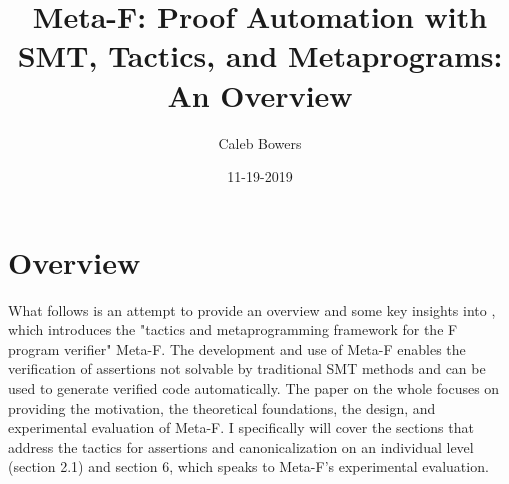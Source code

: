 \documentclass[10pt, journal]{IEEEtran}
\title{Meta-F\text{*}: Proof Automation with SMT, Tactics, and Metaprograms: An Overview}
\author{Caleb Bowers}
\date{11-19-2019}
\begin{document}
\maketitle

\section{Overview}
What follows is an attempt to provide an overview and some key insights into \cite{Guido2018}, which introduces the "tactics and metaprogramming framework for the F\text{*} program verifier" Meta-F\text{*}. The development and use of Meta-F\text{*} enables the verification of assertions not solvable by traditional SMT methods and can be used to generate verified code automatically. The paper on the whole focuses on providing the motivation, the theoretical foundations, the design, and experimental evaluation of Meta-F\text{*}. I specifically will cover the sections that address the tactics for assertions and canonicalization on an individual level (section 2.1) and section 6, which speaks to Meta-F\text{*}'s experimental evaluation.
\end{document}
